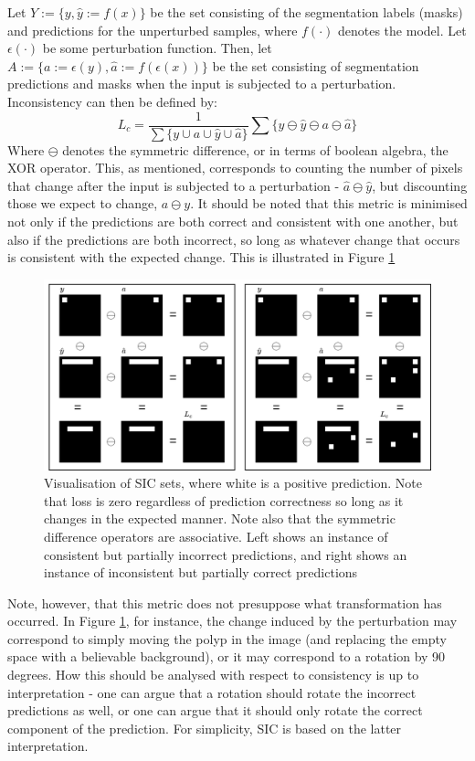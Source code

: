 Let \(Y:=\{y,\hat{y}:=f(x)\}\) be the set consisting of the segmentation labels (masks) and predictions for the unperturbed samples, where \(f(\cdot)\) denotes the model. Let \(\epsilon(\cdot)\) be some perturbation function. Then, let \(A:=\{a:=\epsilon(y),\hat{a}:=f(\epsilon(x))\}\) be the set consisting of segmentation predictions and masks when the input is subjected to a perturbation. Inconsistency can then be defined by:
\begin{equation}
    L_c = \frac{1}{\sum\{y \cup a \cup \hat{y} \cup \hat{a} \}} \sum \{y\ominus\hat{y}\ominus a\ominus\hat{a}\}
\end{equation}
Where \(\ominus \) denotes the symmetric difference, or in terms of boolean algebra, the XOR operator.
This, as mentioned, corresponds to counting the number of pixels that change after the input is subjected to a perturbation - \(\hat{a}\ominus \hat{y}\), but discounting those we expect to change, \(a\ominus y\). 
It should be noted that this metric is minimised not only if the predictions are both correct and consistent with one another, but also if the predictions are both incorrect, so long as whatever change that occurs is consistent with the expected change. This is illustrated in Figure \ref{loss_fn}
\begin{figure}[h]
    \includegraphics[width=\linewidth]{illustrations/loss_visualisation.drawio.png}
    \caption{Visualisation of SIC sets, where white is a positive prediction. Note that loss is zero regardless of prediction correctness so long as it changes in the expected manner. Note also that the symmetric difference operators are associative. Left shows an instance of consistent but partially incorrect predictions, and right shows an instance of inconsistent but partially correct predictions}
    \label{loss_fn}
\end{figure}  
    
Note, however, that this metric does not presuppose what transformation has occurred. In Figure \ref{loss_fn}, for instance, the change induced by the perturbation may correspond to simply moving the polyp in the image (and replacing the empty space with a believable background), or it may correspond to a rotation by 90 degrees. How this should be analysed with respect to consistency is up to interpretation - one can argue that a rotation should rotate the incorrect predictions as well, or one can argue that it should only rotate the correct component of the prediction. For simplicity, SIC is based on the latter interpretation. 

